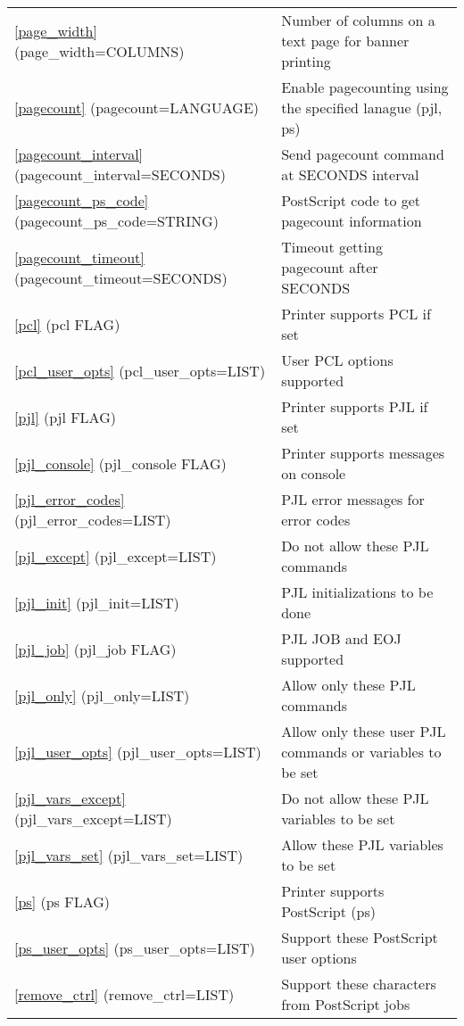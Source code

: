 \documentclass[a4paper]{article}
\begin{document}
\begin{table}[tbp]
\begin{center}
\begin{tabular}{ll}
{\ttfamily \ref{page_width} {(page\_width=COLUMNS)}}&  Number of columns on a text page for banner printing\\ 
{\ttfamily \ref{pagecount} {(pagecount=LANGUAGE)}}&  Enable pagecounting using the specified lanague (pjl, ps)\\ 
{\ttfamily \ref{pagecount_interval} {(pagecount\_interval=SECONDS)}}&  Send pagecount command at SECONDS interval\\ 
{\ttfamily \ref{pagecount_ps_code} {(pagecount\_ps\_code=STRING)}}&  PostScript code to get pagecount information\\ 
{\ttfamily \ref{pagecount_timeout} {(pagecount\_timeout=SECONDS)}}&  Timeout getting pagecount after SECONDS\\ 
{\ttfamily \ref{pcl} {(pcl FLAG)}}&  Printer supports PCL if set\\ 
{\ttfamily \ref{pcl_user_opts} {(pcl\_user\_opts=LIST)}}&  User PCL options supported\\ 
{\ttfamily \ref{pjl} {(pjl FLAG)}}&  Printer supports PJL if set\\ 
{\ttfamily \ref{pjl_console} {(pjl\_console FLAG)}}&  Printer supports messages on console\\ 
{\ttfamily \ref{pjl_error_codes} {(pjl\_error\_codes=LIST)}}&  PJL error messages for error codes\\ 
{\ttfamily \ref{pjl_except} {(pjl\_except=LIST)}}&  Do not allow these PJL commands\\ 
{\ttfamily \ref{pjl_init} {(pjl\_init=LIST)}}&  PJL initializations to be done\\ 
{\ttfamily \ref{pjl_job} {(pjl\_job FLAG)}}&  PJL JOB and EOJ supported\\ 
{\ttfamily \ref{pjl_only} {(pjl\_only=LIST)}}&  Allow only these PJL commands\\ 
{\ttfamily \ref{pjl_user_opts} {(pjl\_user\_opts=LIST)}}&  Allow only these user PJL commands or variables to be set\\ 
{\ttfamily \ref{pjl_vars_except} {(pjl\_vars\_except=LIST)}}&  Do not allow these PJL variables to be set\\ 
{\ttfamily \ref{pjl_vars_set} {(pjl\_vars\_set=LIST)}}&  Allow these PJL variables to be set\\ 
{\ttfamily \ref{ps} {(ps FLAG)}}&  Printer supports PostScript (ps)\\ 
{\ttfamily \ref{ps_user_opts} {(ps\_user\_opts=LIST)}}&  Support these PostScript user options\\ 
{\ttfamily \ref{remove_ctrl} {(remove\_ctrl=LIST)}}&  Support these characters from PostScript jobs\\ 
\end{tabular}
\end{center}
\end{table}
\end{document}
